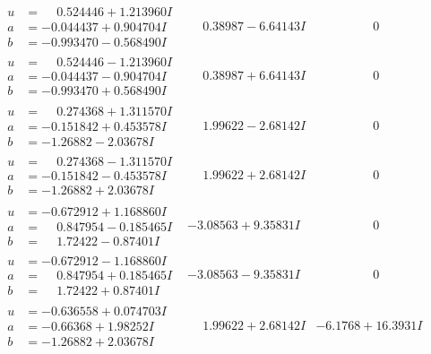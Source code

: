 \documentclass[1p]{elsarticle_modified}
\theoremstyle{definition}
\begin{document}
$$\begin{array}{c|c|c}
\begin{aligned}
u &= \phantom{-}0.524446 + 1.213960 I \\
a &= -0.044437 + 0.904704 I \\
b &= -0.993470 - 0.568490 I\end{aligned}
 & \phantom{-}0.38987 - 6.64143 I & \phantom{-0.000000 } 0 \\ \hline\begin{aligned}
u &= \phantom{-}0.524446 - 1.213960 I \\
a &= -0.044437 - 0.904704 I \\
b &= -0.993470 + 0.568490 I\end{aligned}
 & \phantom{-}0.38987 + 6.64143 I & \phantom{-0.000000 } 0 \\ \hline\begin{aligned}
u &= \phantom{-}0.274368 + 1.311570 I \\
a &= -0.151842 + 0.453578 I \\
b &= -1.26882 - 2.03678 I\end{aligned}
 & \phantom{-}1.99622 - 2.68142 I & \phantom{-0.000000 } 0 \\ \hline\begin{aligned}
u &= \phantom{-}0.274368 - 1.311570 I \\
a &= -0.151842 - 0.453578 I \\
b &= -1.26882 + 2.03678 I\end{aligned}
 & \phantom{-}1.99622 + 2.68142 I & \phantom{-0.000000 } 0 \\ \hline\begin{aligned}
u &= -0.672912 + 1.168860 I \\
a &= \phantom{-}0.847954 - 0.185465 I \\
b &= \phantom{-}1.72422 - 0.87401 I\end{aligned}
 & -3.08563 + 9.35831 I & \phantom{-0.000000 } 0 \\ \hline\begin{aligned}
u &= -0.672912 - 1.168860 I \\
a &= \phantom{-}0.847954 + 0.185465 I \\
b &= \phantom{-}1.72422 + 0.87401 I\end{aligned}
 & -3.08563 - 9.35831 I & \phantom{-0.000000 } 0 \\ \hline\begin{aligned}
u &= -0.636558 + 0.074703 I \\
a &= -0.66368 + 1.98252 I \\
b &= -1.26882 + 2.03678 I\end{aligned}
 & \phantom{-}1.99622 + 2.68142 I & -6.1768 + 16.3931 I \\ \hline\begin{aligned}

\end{aligned}
\end{array}$$
\end{document}
